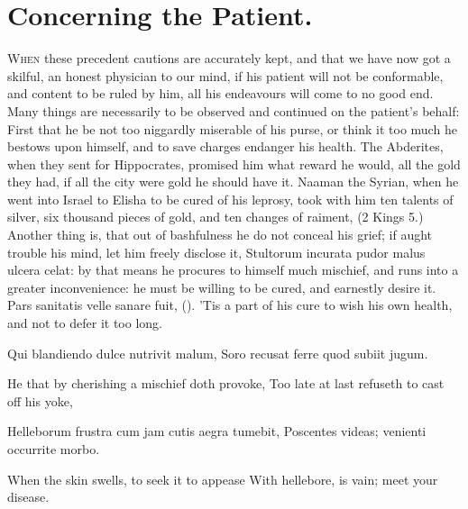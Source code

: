 {%
\section{Concerning the Patient.}

\lettrine{W}{hen} these precedent cautions are accurately kept, and that we have now
got a skilful, an honest physician to our mind, if his patient will not
be conformable, and content to be ruled by him, all his endeavours will
come to no good end. Many things are necessarily to be observed and
continued on the patient's behalf: First that he be not too niggardly
miserable of his purse, or think it too much he bestows upon himself,
and to save charges endanger his health. The Abderites, when they sent
for Hippocrates, promised him what reward he would, all the
gold they had, if all the city were gold he should have it. Naaman the
Syrian, when he went into Israel to Elisha to be cured of his leprosy,
took with him ten talents of silver, six thousand pieces of gold, and
ten changes of raiment, (2 Kings  5.) Another thing is, that out of
bashfulness he do not conceal his grief; if aught trouble his mind, let
him freely disclose it, Stultorum incurata pudor malus ulcera celat: by
that means he procures to himself much mischief, and runs into a
greater inconvenience: he must be willing to be cured, and earnestly
desire it. Pars sanitatis velle sanare fuit, (\Seneca). 'Tis a part of
his cure to wish his own health, and not to defer it too long.

Qui blandiendo dulce nutrivit malum,
Soro recusat ferre quod subiit jugum.


He that by cherishing a mischief doth provoke,
Too late at last refuseth to cast off his yoke,

Helleborum frustra cum jam cutis aegra tumebit,
Poscentes videas; venienti occurrite morbo.

When the skin swells, to seek it to appease
With hellebore, is vain; meet your disease.

}

